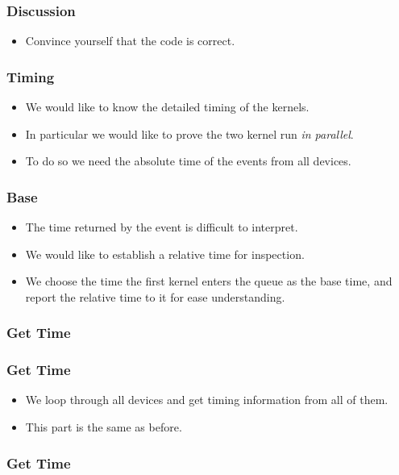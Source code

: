 \documentclass{beamer}
\begin{document}
\begin{frame}
  \frametitle{Discussion}
  \begin{itemize}
    \item Convince yourself that the code is correct.
  \end{itemize}
\end{frame}

\begin{frame}
  \frametitle{Timing}
  \begin{itemize}
    \item We would like to know the detailed timing of the kernels.
    \item In particular we would like to prove the two kernel run {\em in
      parallel}.
    \item To do so we need the absolute time of the events from all devices.
  \end{itemize}
\end{frame}

\begin{frame}
  \frametitle{Base}
  \begin{itemize}
    \item The time returned by the event is difficult to interpret.
    \item We would like to establish a relative time for inspection.
      \item We choose the time the first kernel enters the queue as
        the base time, and report the relative time to it for ease
        understanding.
  \end{itemize}
\end{frame}

\begin{frame}
  \frametitle{Get Time}
\end{frame}

\begin{frame}
  \frametitle{Get Time}
  \begin{itemize}
    \item We loop through all devices and get timing information from
      all of them.
    \item This part is the same as before.
  \end{itemize}
\end{frame}

\begin{frame}
  \frametitle{Get Time}
\end{frame}
\end{document}
